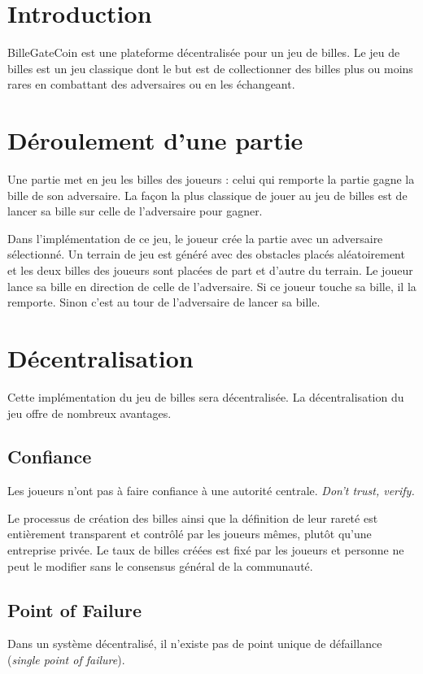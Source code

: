 \documentclass{article}
\begin{document}
\section{Introduction}
BilleGateCoin est une plateforme décentralisée pour un jeu de billes.
Le jeu de billes est un jeu classique dont le but est de collectionner des billes plus ou moins rares en combattant des adversaires ou en les échangeant.

\section{Déroulement d'une partie}
Une partie met en jeu les billes des joueurs : celui qui remporte la partie gagne la bille de son adversaire.
La façon la plus classique de jouer au jeu de billes est de lancer sa bille sur celle de l'adversaire pour gagner.

Dans l'implémentation de ce jeu, le joueur crée la partie avec un adversaire sélectionné.
Un terrain de jeu est généré avec des obstacles placés aléatoirement et les deux billes des joueurs sont placées de part et d'autre du terrain. Le joueur lance sa bille en direction de celle de l'adversaire. Si ce joueur touche sa bille, il la remporte. Sinon c'est au tour de l'adversaire de lancer sa bille. 


\section{Décentralisation}
Cette implémentation du jeu de billes sera décentralisée. 
La décentralisation du jeu offre de nombreux avantages.

\subsection{Confiance}
Les joueurs n'ont pas à faire confiance à une autorité centrale. 
\textit{Don't trust, verify.}

Le processus de création des billes ainsi que la définition de leur rareté est entièrement transparent et contrôlé par les joueurs mêmes, plutôt qu'une entreprise privée. Le taux de billes créées est fixé par les joueurs et personne ne peut le modifier sans le consensus général de la communauté.

\subsection{Point of Failure}
Dans un système décentralisé, il n'existe pas de point unique de défaillance (\textit{single point of failure}). 
\end{document}
